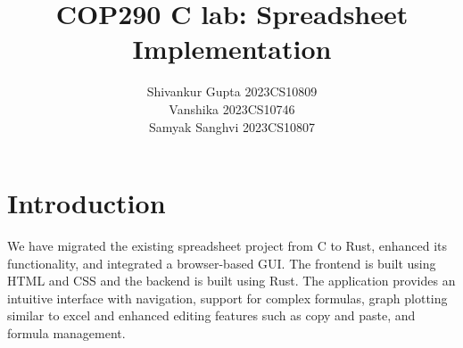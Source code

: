 \documentclass[10pt,a4paper]{article}  %
\title{COP290 C lab: Spreadsheet Implementation}
\author{Shivankur Gupta 2023CS10809\\ Vanshika 2023CS10746\\ Samyak Sanghvi 2023CS10807}
\begin{document}
\maketitle



\tableofcontents

\section{Introduction}
We have migrated the existing spreadsheet project from C to Rust, enhanced its functionality, and integrated a browser-based GUI. The frontend is built using HTML and CSS and the backend is built using Rust. The application provides an intuitive interface with navigation, support for complex formulas, graph plotting similar to excel and enhanced editing features such as copy and paste, and formula management.
\end{document}
